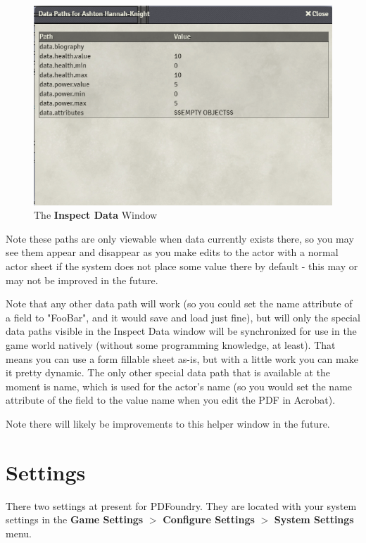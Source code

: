 \documentclass{article}
\begin{document}
    \begin{figure}[h]
        \centering
        \includegraphics[width=1\textwidth]{images/actor-sheet-inspect-data.png}
        \caption{The \textbf{Inspect Data} Window}
        \label{fig:actor-sheet-inspect-data}
    \end{figure}

    Note these paths are only viewable when data currently exists there, so you may see them appear and disappear as you make edits to the actor with a normal actor sheet if the system does not place some value there by default - this may or may not be improved in the future.

    Note that any other data path will work (so you could set the name attribute of a field to "FooBar", and it would save and load just fine), but will only the special data paths visible in the Inspect Data window will be synchronized for use in the game world natively (without some programming knowledge, at least). That means you can use a form fillable sheet as-is, but with a little work you can make it pretty dynamic. The only other special data path that is available at the moment is name, which is used for the actor's name (so you would set the name attribute of the field to the value name when you edit the PDF in Acrobat).

    Note there will likely be improvements to this helper window in the future.

    \section{Settings}
    There two settings at present for PDFoundry. They are located with your system settings in the \textbf{Game Settings} $>$ \textbf{Configure Settings} $>$ \textbf{System Settings} menu.
\end{document}
